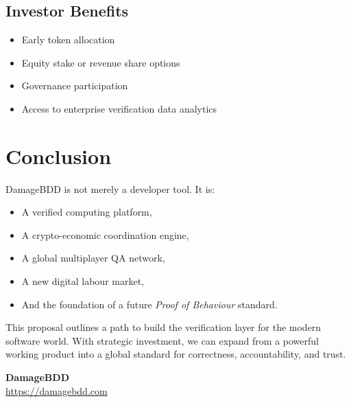 \documentclass[12pt,a4paper]{article}
\begin{document}
\subsection{Investor Benefits}

\begin{itemize}
    \item Early token allocation
    \item Equity stake or revenue share options
    \item Governance participation
    \item Access to enterprise verification data analytics
\end{itemize}

\section{Conclusion}

DamageBDD is not merely a developer tool. It is:

\begin{itemize}
    \item A verified computing platform,
    \item A crypto-economic coordination engine,
    \item A global multiplayer QA network,
    \item A new digital labour market,
    \item And the foundation of a future \emph{Proof of Behaviour} standard.
\end{itemize}

This proposal outlines a path to build the verification layer for the modern software world. With strategic investment, we can expand from a powerful working product into a global standard for correctness, accountability, and trust.

\vfill
\begin{center}
\textbf{DamageBDD} \\[4pt]
\url{https://damagebdd.com}
\end{center}
\end{document}
